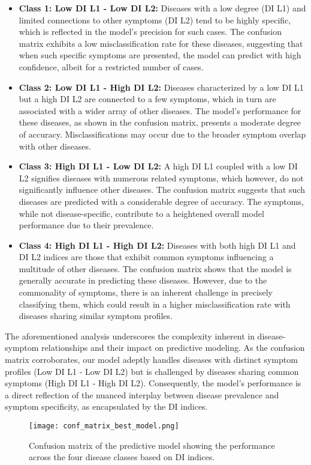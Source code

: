 \begin{itemize}
	\item \textbf{Class 1: Low DI L1 - Low DI L2:} Diseases with a low degree (DI L1) and limited connections to other symptoms (DI L2)
	      tend to be highly specific, which is reflected in the model's precision for such cases.
	      The confusion matrix exhibits a low misclassification rate for these diseases,
	      suggesting that when such specific symptoms are presented, the model can predict with high confidence,
	      albeit for a restricted number of cases.

	\item \textbf{Class 2: Low DI L1 - High DI L2:} Diseases characterized by a low DI L1 but a high DI L2 are connected to a few symptoms,
	      which in turn are associated with a wider array of other diseases. The model's performance for these diseases,
	      as shown in the confusion matrix, presents a moderate degree of accuracy.
	      Misclassifications may occur due to the broader symptom overlap with other diseases.

	\item \textbf{Class 3: High DI L1 - Low DI L2:} A high DI L1 coupled with a low DI L2 signifies diseases with numerous related symptoms,
	      which however, do not significantly influence other diseases.
	      The confusion matrix suggests that such diseases are predicted with a considerable degree of accuracy.
	      The symptoms, while not disease-specific, contribute to a heightened overall model performance due to their prevalence.

	\item \textbf{Class 4: High DI L1 - High DI L2:} Diseases with both high DI L1 and DI L2 indices are those that exhibit common symptoms
	      influencing a multitude of other diseases. The confusion matrix shows that the model is generally accurate in predicting these diseases.
	      However, due to the commonality of symptoms, there is an inherent challenge in precisely classifying them,
	      which could result in a higher misclassification rate with diseases sharing similar symptom profiles.
\end{itemize}
\noindent
The aforementioned analysis underscores the complexity inherent in disease-symptom relationships and their impact on predictive modeling.
As the confusion matrix corroborates, our model adeptly handles diseases with distinct symptom profiles (Low DI L1 - Low DI L2)
but is challenged by diseases sharing common symptoms (High DI L1 - High DI L2).
Consequently, the model's performance is a direct reflection of the nuanced interplay between disease prevalence and symptom specificity,
as encapsulated by the DI indices.
\begin{figure}[H]
	\centering
	\texttt{[image: conf\_matrix\_best\_model.png]}
	\caption{Confusion matrix of the predictive model showing the performance across the four disease classes based on DI indices.}\label{fig:conf_matrix}
\end{figure}
\noindent

